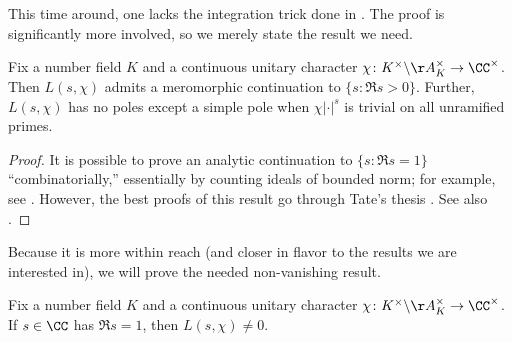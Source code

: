 \documentclass[../thesis.tex]{subfiles}
\begin{document}
This time around, one lacks the integration trick done in . The proof is significantly more involved, so we merely state the result we need.
\begin{theorem}[Hecke] \label{thm:hecke-continue}
	Fix a number field $K$ and a continuous unitary character $\chi\colon K^\times\backslash\AA_K^\times\to\CC^\times$. Then $L(s,\chi)$ admits a meromorphic continuation to $\{s:\Re s>0\}$. Further, $L(s,\chi)$ has no poles except a simple pole when $\chi\left|\cdot\right|^s$ is trivial on all unramified primes.
\end{theorem}
\begin{proof}
	It is possible to prove an analytic continuation to $\{s:\Re s=1\}$ ``combinatorially,'' essentially by counting ideals of bounded norm; for example, see \cite[Section~11.2]{murty-alg-nt}. However, the best proofs of this result go through Tate's thesis \cite{tate-thesis}. See also \cite[Theorem~7-19]{rv-fourier-analysis-number-fields}.
\end{proof}
Because it is more within reach (and closer in flavor to the results we are interested in), we will prove the needed non-vanishing result.
\begin{proposition} \label{prop:hecke-nonvanish}
	Fix a number field $K$ and a continuous unitary character $\chi\colon K^\times\backslash\AA_K^\times\to\CC^\times$. If $s\in\CC$ has $\Re s=1$, then $L(s,\chi)\ne0$.
\end{proposition}
\end{document}
